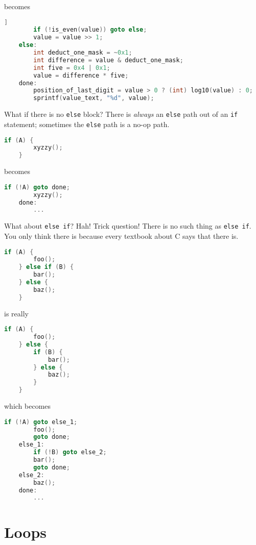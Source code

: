 \documentclass{article}
\begin{document}
becomes

\begin{lstlisting}[language=C, linebackgroundcolor={
    %    \ifodd\value{lstnumber}\color{green}\fi
    \ifnum\value{lstnumber}=1 \color{green}\fi,
    \ifnum\value{lstnumber}=3 \color{green}\fi,
    \ifnum\value{lstnumber}=8 \color{green}\fi,
}]]
        if (!is_even(value)) goto else;
        value = value >> 1;
    else:
        int deduct_one_mask = ~0x1;
        int difference = value & deduct_one_mask;
        int five = 0x4 | 0x1;
        value = difference * five;
    done:
        position_of_last_digit = value > 0 ? (int) log10(value) : 0;
        sprintf(value_text, "%d", value);
\end{lstlisting}

What if there is no \lstinline{else} block?
There is \textit{always} an \lstinline{else} path out of an \lstinline{if} statement;
sometimes the \lstinline{else} path is a no-op path.

\begin{lstlisting}[language=C]
    if (A) {
        xyzzy();
    }
\end{lstlisting}

becomes

\begin{lstlisting}[language=C]
        if (!A) goto done;
        xyzzy();
    done:
        ...
\end{lstlisting}

What about \lstinline{else if}?
Hah!
Trick question!
There is no such thing as \lstinline{else if}.
You only think there is because every textbook about C says that there is.

\begin{lstlisting}[language=C]
    if (A) {
        foo();
    } else if (B) {
        bar();
    } else {
        baz();
    }
\end{lstlisting}
is really
\begin{lstlisting}[language=C]
    if (A) {
        foo();
    } else {
        if (B) {
            bar();
        } else {
            baz();
        }
    }
\end{lstlisting}
which becomes
\begin{lstlisting}[language=C]
        if (!A) goto else_1;
        foo();
        goto done;
    else_1:
        if (!B) goto else_2;
        bar();
        goto done;
    else_2:
        baz();
    done:
        ...
\end{lstlisting}

\section{Loops}
\end{document}
